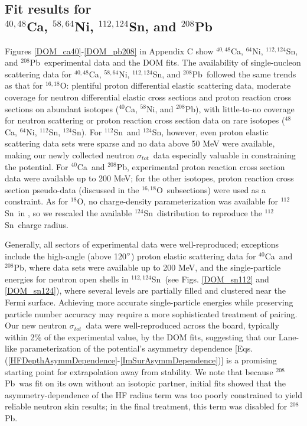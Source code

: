 \documentclass[twocolumn,secnumarabic,amssymb, nobibnotes, aps, prl,
superscriptaddress, nobalancelastpage, floatfix]{revtex4}
\newcommand{\tot}{\ensuremath{\sigma_{tot}}}
\newcommand{\oEight}{\ensuremath{^{18}}O}
\newcommand{\oSixEight}{\ensuremath{^{16,18}}O}
\newcommand{\caForty}{\ensuremath{^{40}}C\lowercase{a}}
\newcommand{\caEight}{\ensuremath{^{48}}C\lowercase{a}}
\newcommand{\caAughtEight}{\ensuremath{^{40,48}}C\lowercase{a}}
\newcommand{\niEight}{\ensuremath{^{58}}N\lowercase{i}}
\newcommand{\niFour}{\ensuremath{^{64}}N\lowercase{i}}
\newcommand{\niEightFour}{\ensuremath{^{58,64}}N\lowercase{i}}
\newcommand{\snTwelve}{\ensuremath{^{112}}S\lowercase{n}}
\newcommand{\snFour}{\ensuremath{^{124}}S\lowercase{n}}
\newcommand{\snTwelveFour}{\ensuremath{^{112,124}}S\lowercase{n}}
\newcommand{\pbEight}{\ensuremath{^{208}}P\lowercase{b}}
\begin{document}
\subsection{Fit results for \\ \caAughtEight, \niEightFour, \snTwelveFour, and \pbEight}
Figures \ref{DOM_ca40}-\ref{DOM_pb208} in Appendix C show
\caAughtEight, \niFour, \snTwelveFour, and \pbEight\ experimental data and the DOM fits. 
The availability of single-nucleon scattering data for
\caAughtEight, \niEightFour, \snTwelveFour, and \pbEight\ followed the same trends as that
for \oSixEight: 
plentiful proton differential elastic scattering data, moderate coverage for
neutron differential elastic cross sections and proton reaction cross sections on abundant isotopes
(\caForty, \niEight, and \pbEight), with little-to-no coverage for neutron scattering
or proton reaction cross section data on rare isotopes (\caEight, \niFour, \snTwelve, \snFour).
For \snTwelve\ and \snFour, however, even proton elastic scattering data sets were sparse and no 
data above 50 MeV were available, making our newly collected neutron \tot\ data especially valuable
in constraining the potential. For \caForty\ and \pbEight, experimental proton reaction cross 
section data were available up to 200 MeV; for the other isotopes, proton reaction cross section 
pseudo-data (discussed in the \oSixEight\ subsections) were used as a constraint.
As for \oEight, no charge-density parameterization was available for \snTwelve\ in 
\cite{DeVries1987}, so we rescaled the available \snFour\ distribution to reproduce the \snTwelve\
charge radius.

Generally, all sectors of experimental data were well-reproduced; exceptions include
the high-angle (above 120$\degree$) proton elastic scattering data for \caForty\ and
\pbEight, where data sets were available up to 200 MeV, and the single-particle energies for 
neutron open shells in \snTwelveFour\ (see Figs. \ref{DOM_sn112} and \ref{DOM_sn124}), where 
several levels are partially filled and clustered near the Fermi surface. Achieving more accurate single-particle 
energies while preserving particle number accuracy may require a more sophisticated treatment of pairing.
Our new neutron \tot\ data were well-reproduced across the board, typically within 2\% of the experimental value,
by the DOM fits, suggesting that our Lane-like parameterization of the potential's asymmetry dependence [Eqs.
(\ref{HFDepthAsymmDependence}-\ref{ImSurAsymmDependence})] is a promising starting point for extrapolation away from stability.
We note that because \pbEight\ was fit on its own without an isotopic partner, initial fits showed
that the asymmetry-dependence of the HF radius term was too poorly constrained to yield reliable neutron skin
results; in the final treatment, this term was disabled for \pbEight.
\end{document}
